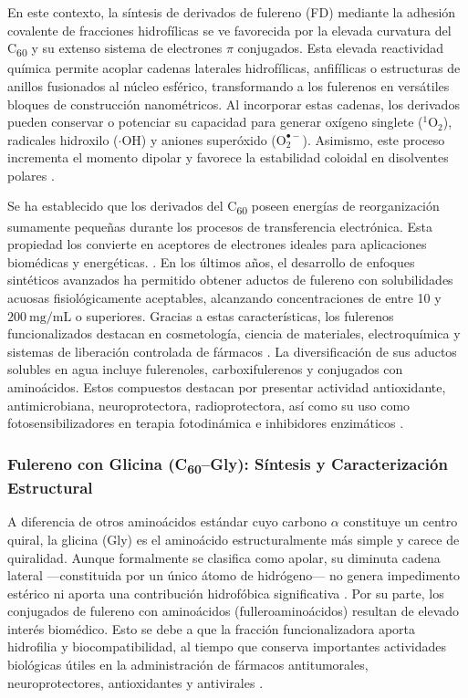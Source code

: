 En este contexto, la síntesis de derivados de fulereno (FD) mediante la adhesión covalente de fracciones hidrofílicas se ve favorecida por la elevada curvatura del C\textsubscript{60} y su extenso sistema de electrones $\pi$ conjugados. Esta elevada reactividad química permite acoplar cadenas laterales hidrofílicas, anfifílicas o estructuras de anillos fusionados al núcleo esférico, transformando a los fulerenos en versátiles bloques de construcción nanométricos. Al incorporar estas cadenas, los derivados pueden conservar o potenciar su capacidad para generar oxígeno singlete ($^1\text{O}_2$), radicales hidroxilo ($\cdot\text{OH}$) y aniones superóxido ($\text{O}_2^{\bullet-}$). Asimismo, este proceso incrementa el momento dipolar y favorece la estabilidad coloidal en disolventes polares \cite{gaur2021biomedical}.

Se ha establecido que los derivados del C\textsubscript{60} poseen energías de reorganización sumamente pequeñas durante los procesos de transferencia electrónica. Esta propiedad los convierte en aceptores de electrones ideales para aplicaciones biomédicas y energéticas. \cite{sharoyko2021biologically, nelson2022principios}. En los últimos años, el desarrollo de enfoques sintéticos avanzados ha permitido obtener aductos de fulereno con solubilidades acuosas fisiológicamente aceptables, alcanzando concentraciones de entre 10 y $200\ \text{mg/mL}$ o superiores. %
 Gracias a estas características, los fulerenos funcionalizados destacan en cosmetología, ciencia de materiales, electroquímica y sistemas de liberación controlada de fármacos \cite{andrada2012nanotecnologia, liu2024quantum}. La diversificación de sus aductos solubles en agua incluye fulerenoles, carboxifulerenos y conjugados con aminoácidos. Estos compuestos destacan por presentar actividad antioxidante, antimicrobiana, neuroprotectora, radioprotectora, así como su uso como fotosensibilizadores en terapia fotodinámica e inhibidores enzimáticos \cite{marforio2021dissecting}.

\subsubsection{Fulereno con Glicina (C\textsubscript{60}--Gly): Síntesis y Caracterización Estructural}

A diferencia de otros aminoácidos estándar cuyo carbono $\alpha$ constituye un centro quiral, la glicina (Gly) es el aminoácido estructuralmente más simple y carece de quiralidad. Aunque formalmente se clasifica como apolar, su diminuta cadena lateral —constituida por un único átomo de hidrógeno— no genera impedimento estérico ni aporta una contribución hidrofóbica significativa \cite{bolshakova2023facile}. Por su parte, los conjugados de fulereno con aminoácidos (fulleroaminoácidos) resultan de elevado interés biomédico. Esto se debe a que la fracción funcionalizadora aporta hidrofilia y biocompatibilidad, al tiempo que conserva importantes actividades biológicas útiles en la administración de fármacos antitumorales, neuroprotectores, antioxidantes y antivirales \cite{jiang2015synthesis}.

